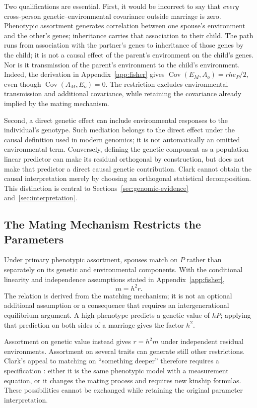 Two qualifications are essential. First, it would be incorrect to say
that \emph{every} cross-person genetic--environmental covariance outside
marriage is zero. Phenotypic assortment generates correlation between one
spouse's environment and the other's genes; inheritance carries that
association to their child. The path runs from association with the
partner's genes to inheritance of those genes by the child; it is not a
causal effect of the parent's environment on the child's genes. Nor is it
transmission of the parent's environment to the child's environment.
Indeed, the derivation in Appendix~\ref{app:fisher} gives
$\operatorname{Cov}(E_M,A_o)=r h e_P/2$, even though
$\operatorname{Cov}(A_M,E_o)=0$. The restriction excludes environmental
transmission and additional covariance, while retaining the covariance
already implied by the mating mechanism.

Second, a direct genetic effect can include environmental responses to
the individual's genotype. Such mediation belongs to the direct effect
under the causal definition used in modern genomics; it is not automatically
an omitted environmental term. Conversely, defining the genetic component
as a population linear predictor can make its residual orthogonal by
construction, but does not make that predictor a direct causal genetic
contribution. Clark cannot obtain the causal interpretation merely by
choosing an orthogonal statistical decomposition. This distinction is
central to Sections~\ref{sec:genomic-evidence} and~\ref{sec:interpretation}.


\subsection{The Mating Mechanism Restricts the Parameters}
Under primary phenotypic assortment, spouses match on $P$ rather than
separately on its genetic and environmental components. With the conditional
linearity and independence assumptions stated in Appendix~\ref{app:fisher},
\begin{equation}
 m=h^2r.\label{eq:overview-restriction}
\end{equation}
The relation is derived from the matching mechanism; it is not an optional
additional assumption or a consequence that requires an intergenerational
equilibrium argument. A high phenotype predicts a genetic value of $hP$;
applying that prediction on both sides of a marriage gives the factor $h^2$.

Assortment on genetic value instead gives $r=h^2m$ under independent
residual environments. Assortment on several traits can generate still
other restrictions. Clark's appeal to matching on ``something deeper''
therefore requires a specification \citep[pp.~16,75]{Clark2026}: either it is the same phenotypic
model with a measurement equation, or it changes the mating process and
requires new kinship formulas. These possibilities cannot be exchanged
while retaining the original parameter interpretation.

